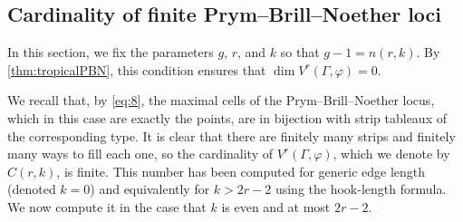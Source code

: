 \documentclass[11pt,reqno]{amsart}
\newcommand{\derek}[1]{{\color{Green} \sf D: [#1]}}
\newcommand{\steven}[1]{\textcolor{pink}{\sf S: [#1]}}
\theoremstyle{definition}
\theoremstyle{problem}
\theoremstyle{plain}
\theoremstyle{remark}
\theoremstyle{theorem}
\numberwithin{equation}{section}
\numberwithin{figure}{section}
\begin{document}
\subsection{Cardinality of finite Prym--Brill--Noether loci}\label{sec:finite}

In this section, we fix the parameters $g$, $r$, and $k$ so that
$g-1=n(r,k)$.  By \cref{thm:tropicalPBN}, this condition ensures that
$\dim V^r(\Gamma,\varphi) = 0$.

We recall that, by \cref{eq:8}, the maximal cells of the
Prym--Brill--Noether locus, which in this case are exactly the points,
are in bijection with strip tableaux of the corresponding type.  It is
clear that there are finitely many strips and finitely many ways to
fill each one, so the cardinality of $V^r(\Gamma,\varphi)$, which we
denote by $C(r,k)$, is finite.  This number has been computed
\cite[Corollary~6.1.5]{len2019skeletons} for generic edge length
(denoted $k = 0$) and equivalently for $k>2r-2$ using the hook-length
formula.  We now compute it in the case that $k$ is even and at most
$2r-2$.



\end{document}
